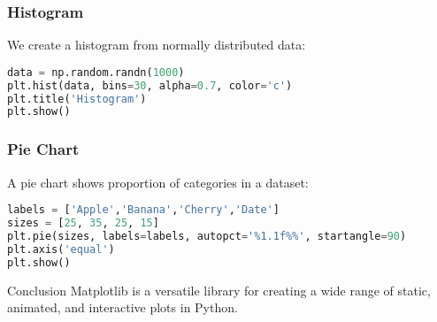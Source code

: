 \begin{frame}[fragile]
\frametitle{Histogram}
We create a histogram from normally distributed data:

\begin{lstlisting}[language=Python]
data = np.random.randn(1000)
plt.hist(data, bins=30, alpha=0.7, color='c')
plt.title('Histogram')
plt.show()
\end{lstlisting}
\end{frame}


\begin{frame}[fragile]
\frametitle{Pie Chart}
A pie chart shows proportion of categories in a dataset:

\begin{lstlisting}[language=Python]
labels = ['Apple','Banana','Cherry','Date']
sizes = [25, 35, 25, 15]
plt.pie(sizes, labels=labels, autopct='%1.1f%%', startangle=90)
plt.axis('equal')
plt.show()
\end{lstlisting}

\end{frame}

\begin{frame}{Conclusion}
Matplotlib is a versatile library for creating a wide range of static, animated, and interactive plots in Python.
\end{frame}

